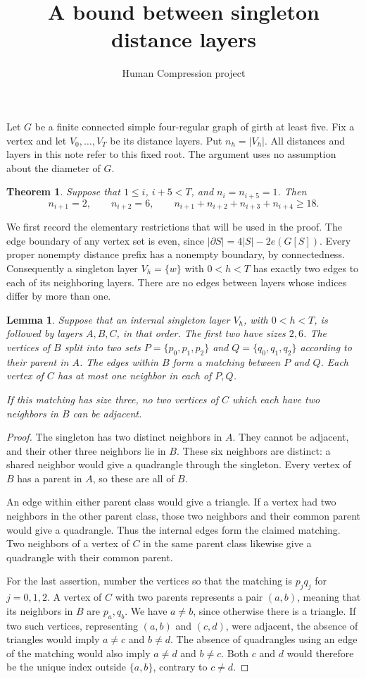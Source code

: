 \documentclass[11pt]{article}
\title{A bound between singleton distance layers}
\author{Human Compression project}
\date{}
\newtheorem{theorem}{Theorem}
\newtheorem{lemma}{Lemma}
\begin{document}
\maketitle

Let $G$ be a finite connected simple four-regular graph of girth at least
five. Fix a vertex and let $V_0,\ldots,V_T$ be its distance layers.
Put $n_h=|V_h|$. All distances and layers in this note refer to this fixed
root. The argument uses no assumption about the diameter of $G$.

\begin{theorem}\label{thm:section}
Suppose that $1\leq i$, $i+5<T$, and $n_i=n_{i+5}=1$. Then
\[
 n_{i+1}=2,\qquad n_{i+2}=6,\qquad
 n_{i+1}+n_{i+2}+n_{i+3}+n_{i+4}\geq18.
\]
\end{theorem}

We first record the elementary restrictions that will be used in the proof.
The edge boundary of any vertex set is even, since
$|\partial S|=4|S|-2e(G[S])$. Every proper nonempty distance prefix has a
nonempty boundary, by connectedness. Consequently a singleton layer
$V_h=\{w\}$ with $0<h<T$ has exactly two edges to each of its neighboring
layers. There are no edges between layers whose indices differ by more
than one.

\begin{lemma}\label{lem:parents}
Suppose that an internal singleton layer $V_h$, with $0<h<T$, is followed
by layers $A,B,C$, in that order. The first two have sizes $2,6$.
The vertices of $B$ split into two
sets $P=\{p_0,p_1,p_2\}$ and $Q=\{q_0,q_1,q_2\}$ according to their
parent in $A$. The edges within $B$ form a matching between $P$ and $Q$.
Each vertex of $C$ has at most one neighbor in each of $P,Q$.

If this matching has size three, no two vertices of $C$ which each have
two neighbors in $B$ can be adjacent.
\end{lemma}
\begin{proof}
The singleton has two distinct neighbors in $A$. They cannot be adjacent,
and their other three neighbors lie in $B$. These six neighbors are
distinct: a shared neighbor would give a quadrangle through the singleton.
Every vertex of $B$ has a parent in $A$, so these are all of $B$.

An edge within either parent class would give a triangle. If a vertex
had two neighbors in the other parent class, those two neighbors and
their common parent would give a quadrangle. Thus the internal edges
form the claimed matching. Two neighbors of a vertex of $C$ in the
same parent class likewise give a quadrangle with their common parent.

For the last assertion, number the vertices so that the matching is
$p_jq_j$ for $j=0,1,2$. A vertex of $C$ with two parents represents a
pair $(a,b)$, meaning that its neighbors in $B$ are $p_a,q_b$.
We have $a\ne b$, since otherwise there is a triangle. If two such
vertices, representing $(a,b)$ and $(c,d)$, were adjacent, the absence
of triangles would imply $a\ne c$ and $b\ne d$. The absence of
quadrangles using an edge of the matching would also imply
$a\ne d$ and $b\ne c$. Both $c$ and $d$ would therefore be the unique
index outside $\{a,b\}$, contrary to $c\ne d$.
\end{proof}
\end{document}
